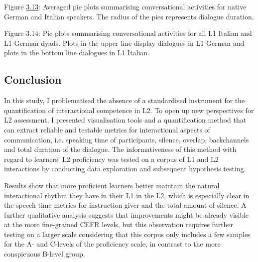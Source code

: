\begin{stylecaption}
Figure \hyperlink{bookmark158}{3.13}: Averaged pie plots summarising conversational activities for native German and Italian speakers. The radius of the pies represents dialogue duration.
\end{stylecaption}

\begin{stylecaption}
  [Warning: Image ignored] %
 
\end{stylecaption}

\begin{stylecaption}
Figure 3.14: Pie plots summarising conversational activities for all L1 Italian and L1 German dyads. Plots in the upper line display dialogues in L1 German and plots in the bottom line dialogues in L1 Italian.
\end{stylecaption}

\subsection{Conclusion}
\hypertarget{Toc191305940}{}\begin{styleStandard}
In this study, I problematised the absence of a standardised instrument for the quantification of interactional competence in L2. To open up new perspectives for L2 assessment, I presented visualisation tools and a quantification method that can extract reliable and testable metrics for interactional aspects of communication, i.e. speaking time of participants, silence, overlap, backchannels and total duration of the dialogue. The informativeness of this method with regard to learners’ L2 proficiency was tested on a corpus of L1 and L2 interactions by conducting data exploration and subsequent hypothesis testing.
\end{styleStandard}

\begin{styleStandard}
Results show that more proficient learners better maintain the natural interactional rhythm they have in their L1 in the L2, which is especially clear in the speech time metrics for instruction giver and the total amount of silence. A further qualitative analysis suggests that improvements might be already visible at the more fine-grained CEFR levels, but this observation requires further testing on a larger scale considering that this corpus only includes a few samples for the A- and C-levels of the proficiency scale, in contrast to the more conspicuous B-level group.
\end{styleStandard}

